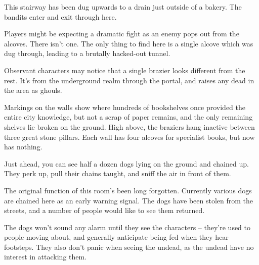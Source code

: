 \label{sewer_map}

\begin{multicols}{2}

\label{bakery_exit}

This stairway has been dug upwards to a drain just outside of a bakery.  The bandits enter and exit through here.

\label{oldlibrary}

Players might be expecting a dramatic fight as an enemy pops out from the alcoves.  There isn't one.  The only thing to find here is a single alcove which was dug through, leading to a brutally hacked-out tunnel.

Observant characters may notice that a single brazier looks different from the rest.  It's from the underground realm through the portal, and raises any dead in the area as ghouls.

\begin{boxtext}

	Markings on the walls show where hundreds of bookshelves once provided the entire city knowledge, but not a scrap of paper remains, and the only remaining shelves lie broken on the ground.  High above, the braziers hang inactive between three great stone pillars.  Each wall has four alcoves for specialist books, but now has nothing.

\end{boxtext}


\begin{boxtext}

	Just ahead, you can see half a dozen dogs lying on the ground and chained up.  They perk up, pull their chains taught, and sniff the air in front of them.

\end{boxtext}

The original function of this room's been long forgotten.  Currently various dogs are chained here as an early warning signal.  The dogs have been stolen from the streets, and a number of people would like to see them returned.

The dogs won't sound any alarm until they see the characters -- they're used to people moving about, and generally anticipate being fed when they hear footsteps.  They also don't panic when seeing the undead, as the undead have no interest in attacking them.


\end{multicols}
